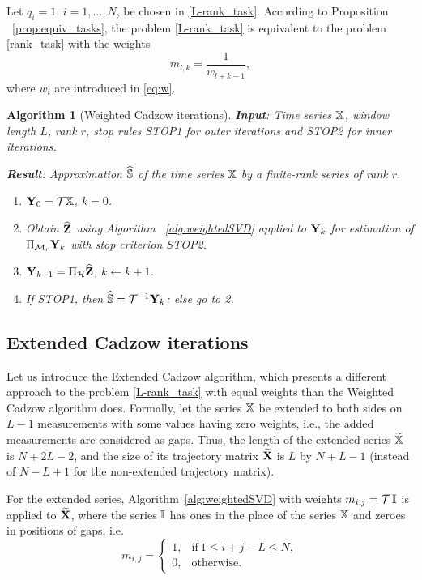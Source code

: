 \documentclass[sii]{ipart}
\newtheorem{algorithm}{Algorithm}
\begin{document}
Let $q_{i}=1$, $i = 1, \ldots, N$, be chosen in \eqref{L-rank_task}. According to Proposition ~\ref{prop:equiv_tasks}, the problem \eqref{L-rank_task} is equivalent to the problem \eqref{rank_task} with the weights
\begin{equation}
\label{Mw}
m_{l, k} = \frac{1}{w_{l + k - 1}},
\end{equation}
where $w_i$ are introduced in \eqref{eq:w}.

\begin{algorithm}[Weighted Cadzow iterations]\label{alg:WCIt}
	\textbf{Input}: Time series $\mathbb{X}$, window length $L$, rank $r$,
	stop rules STOP1 for outer iterations and STOP2 for inner iterations.
	
	\textbf{Result}:
	Approximation $\widehat{\mathbb{S}}$ of the time series $\mathbb{X}$ by a finite-rank series of rank $r$.
	
	\begin{enumerate}
		\item
		$\mathbf{Y}_0 = \mathcal{T} \mathbb{X}$, $k=0$.
		\item
		Obtain $\widehat{\mathbf{Z}}$ using Algorithm ~\ref{alg:weightedSVD} applied to $\mathbf{Y}_k$ for estimation of $\Pi_{\mathcal{M}_r} \mathbf{Y}_{k}$ with stop criterion STOP2.
		\item
		$\mathbf{Y}_{k+1} = \Pi_{\mathcal{H}}  \widehat{\mathbf{Z}}$, $k\leftarrow k+1$.
		\item
		If STOP1, then $\widehat{\mathbb{S}} = \mathcal{T}^{-1} \mathbf{Y}_k$; else go to 2.
	\end{enumerate}
\end{algorithm}

\subsection{Extended Cadzow iterations}
Let us introduce the Extended Cadzow algorithm, which presents a different approach to the problem \eqref{L-rank_task} with equal weights than the Weighted Cadzow algorithm does.
Formally, let the series $\mathbb{X}$ be extended to both sides on $L-1$ measurements with some values having zero weights, i.e., the added measurements are considered as gaps.
Thus, the length of the extended series $\widetilde{\mathbb{X}}$ is $N+2L-2$, and the size of its trajectory matrix $\widetilde{\mathbf{X}}$ is $L$ by $N+L-1$ (instead of $N-L+1$ for the non-extended trajectory matrix).

For the extended series, Algorithm~\ref{alg:weightedSVD} with weights $m_{i,j}=\mathcal{T}\, \mathbb{I}$ is applied to $\widetilde{\mathbf{X}}$, where the series $\mathbb{I}$ has ones in the place of the series $\mathbb{X}$ and zeroes in positions of gaps, i.e.
\begin{equation*}
m_{i,j} = \begin{cases}
1, & \text{if}\ 1 \le i+j-L \le N, \\
0, & \text{otherwise.}
\end{cases}
\end{equation*}
\end{document}
